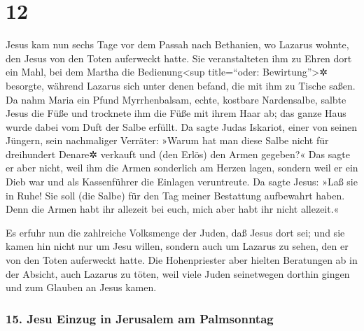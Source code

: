 \hypertarget{section-11}{%
\section{12}\label{section-11}}

 Jesus kam nun sechs Tage vor dem Passah nach Bethanien,
wo Lazarus wohnte, den Jesus von den Toten auferweckt hatte.
 Sie veranstalteten ihm zu Ehren dort ein Mahl, bei dem
Martha die Bedienung\textless sup title=``oder: Bewirtung''\textgreater✲
besorgte, während Lazarus sich unter denen befand, die mit ihm zu Tische
saßen.  Da nahm Maria ein Pfund Myrrhenbalsam, echte,
kostbare Nardensalbe, salbte Jesus die Füße und trocknete ihm die Füße
mit ihrem Haar ab; das ganze Haus wurde dabei vom Duft der Salbe
erfüllt.  Da sagte Judas Iskariot, einer von seinen
Jüngern, sein nachmaliger Verräter:  »Warum hat man diese
Salbe nicht für dreihundert Denare✲ verkauft und (den Erlös) den Armen
gegeben?«  Das sagte er aber nicht, weil ihm die Armen
sonderlich am Herzen lagen, sondern weil er ein Dieb war und als
Kassenführer die Einlagen veruntreute.  Da sagte Jesus:
»Laß sie in Ruhe! Sie soll (die Salbe) für den Tag meiner Bestattung
aufbewahrt haben.  Denn die Armen habt ihr allezeit bei
euch, mich aber habt ihr nicht allezeit.«

 Es erfuhr nun die zahlreiche Volksmenge der Juden, daß
Jesus dort sei; und sie kamen hin nicht nur um Jesu willen, sondern auch
um Lazarus zu sehen, den er von den Toten auferweckt hatte.
 Die Hohenpriester aber hielten Beratungen ab in der
Absicht, auch Lazarus zu töten,  weil viele Juden
seinetwegen dorthin gingen und zum Glauben an Jesus kamen.

\hypertarget{jesu-einzug-in-jerusalem-am-palmsonntag}{%
\subsubsection{15. Jesu Einzug in Jerusalem am
Palmsonntag}\label{jesu-einzug-in-jerusalem-am-palmsonntag}}

